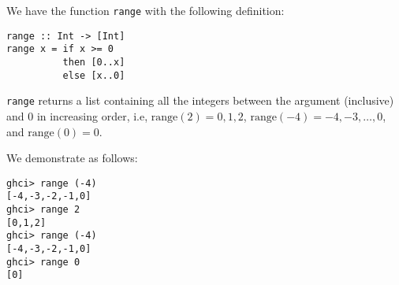 
We have the function \verb|range| with the following definition:
\begin{verbatim}
range :: Int -> [Int]
range x = if x >= 0
          then [0..x]
          else [x..0]
\end{verbatim}
\verb|range| returns a list containing all the integers between the argument 
(inclusive) and 0 in increasing order, i.e, $\text{range}(2) = 0, 1, 2$, 
$\text{range}(-4) = -4, -3, \ldots, 0$, and $\text{range}(0) = 0$.\par
\qquad We demonstrate as follows:
\begin{verbatim}
ghci> range (-4)
[-4,-3,-2,-1,0]
ghci> range 2
[0,1,2]
ghci> range (-4)
[-4,-3,-2,-1,0]
ghci> range 0
[0]
\end{verbatim}
